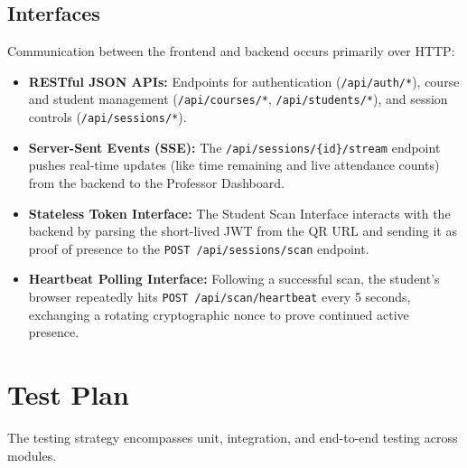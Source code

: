 \documentclass[11pt,a4paper]{article}
\begin{document}
\subsection{Interfaces}
Communication between the frontend and backend occurs primarily over HTTP:
\begin{itemize}
    \item \textbf{RESTful JSON APIs:} Endpoints for authentication (\texttt{/api/auth/*}), course and student management (\texttt{/api/courses/*}, \texttt{/api/students/*}), and session controls (\texttt{/api/sessions/*}).
    \item \textbf{Server-Sent Events (SSE):} The \texttt{/api/sessions/\{id\}/stream} endpoint pushes real-time updates (like time remaining and live attendance counts) from the backend to the Professor Dashboard.
    \item \textbf{Stateless Token Interface:} The Student Scan Interface interacts with the backend by parsing the short-lived JWT from the QR URL and sending it as proof of presence to the \texttt{POST /api/sessions/scan} endpoint.
    \item \textbf{Heartbeat Polling Interface:} Following a successful scan, the student's browser repeatedly hits \texttt{POST /api/scan/heartbeat} every 5 seconds, exchanging a rotating cryptographic nonce to prove continued active presence.
\end{itemize}

\section{Test Plan}

The testing strategy encompasses unit, integration, and end-to-end testing across modules.
\end{document}
